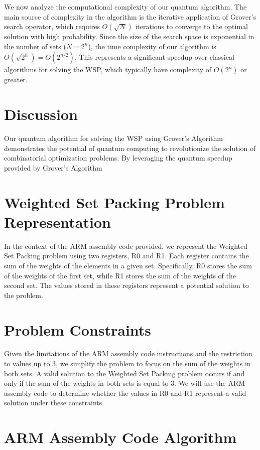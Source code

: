 We now analyze the computational complexity of our quantum algorithm. The main source of complexity in the algorithm is the iterative application of Grover's search operator, which requires $O(\sqrt{N})$ iterations to converge to the optimal solution with high probability. Since the size of the search space is exponential in the number of sets ($N = 2^n$), the time complexity of our algorithm is $O(\sqrt{2^n}) = O(2^{n/2})$. This represents a significant speedup over classical algorithms for solving the WSP, which typically have complexity of $O(2^n)$ or greater.

\section{Discussion}\label{sec:discussion}

Our quantum algorithm for solving the WSP using Grover's Algorithm demonstrates the potential of quantum computing to revolutionize the solution of combinatorial optimization problems. By leveraging the quantum speedup provided by Grover's Algorithm

\section{Weighted Set Packing Problem Representation}

In the context of the ARM assembly code provided, we represent the Weighted Set Packing problem using two registers, R0 and R1. Each register contains the sum of the weights of the elements in a given set. Specifically, R0 stores the sum of the weights of the first set, while R1 stores the sum of the weights of the second set. The values stored in these registers represent a potential solution to the problem.

\section{Problem Constraints}

Given the limitations of the ARM assembly code instructions and the restriction to values up to 3, we simplify the problem to focus on the sum of the weights in both sets. A valid solution to the Weighted Set Packing problem occurs if and only if the sum of the weights in both sets is equal to 3. We will use the ARM assembly code to determine whether the values in R0 and R1 represent a valid solution under these constraints.

\section{ARM Assembly Code Algorithm}

